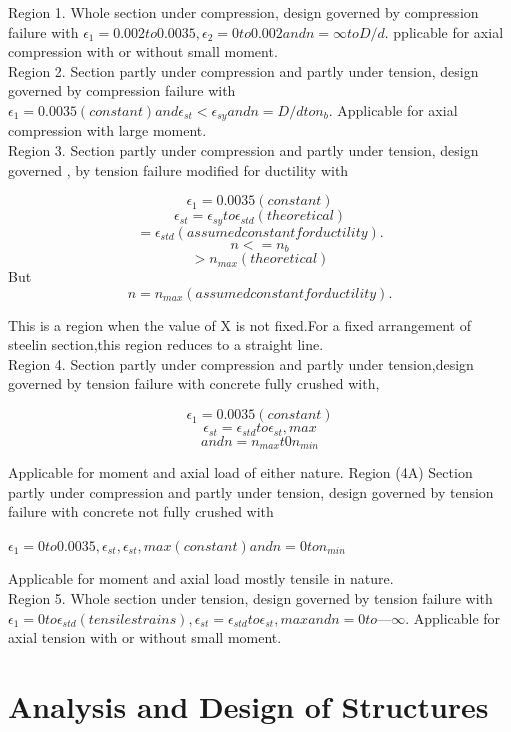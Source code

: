 Region 1. Whole section under compression, design governed by compression
failure with $\epsilon_1=0.002 to 0.0035, \epsilon_2=0 to 0.002 and n=\infty to D/d.$
pplicable for axial compression with or without small moment.\\

Region 2. Section partly under compression and partly under tension,
design governed by compression failure with
$\epsilon_1 = 0.0035 (constant) and \epsilon_{st} < \epsilon_{sy} and n = D/d to n_b.$
Applicable for axial compression with large moment.\\

Region 3. Section partly under compression and partly under tension,
design governed , by tension failure modiﬁed for ductility with

$$\epsilon_1 = 0.0035 (constant)$$
$$\epsilon_{st} =\epsilon_{sy} to \epsilon_{std} (theoretical)$$
$$=\epsilon_{std} (assumed constant for ductility).$$
$$n<= n_b$$
$$>n_{max} (theoretical)$$
But $$n=n_{max} (assumed constant for ductility).$$

This is a region when the value of X is not ﬁxed.For a ﬁxed arrangement
of steelin section,this region reduces to a straight line. \\

Region 4. Section partly under compression and partly under tension,design
governed by tension failure with concrete fully crushed with,

$$\epsilon_1 = 0.0035 (constant)$$
$$\epsilon_{st} = \epsilon_{std} to \epsilon_{st}, max$$
$$and n = n_{max} t0 n_{min}$$

Applicable for moment and axial load of either nature.
Region (4A) Section partly under compression and partly under tension,
design governed by tension failure with concrete not fully crushed with

$\epsilon_1 = 0 to0.0035, \epsilon_{st},\epsilon_{st},max(constant) and n = 0 to n_{min}$

Applicable for moment and axial load mostly tensile in nature.\\
Region 5. Whole section under tension, design governed by tension failure with 
$\epsilon_1 = 0 to \epsilon_{std} (tensile strains), \epsilon_{st}=\epsilon_{std}to \epsilon_{st}, max and n = 0 to — \infty.$
Applicable for axial tension with or without small moment.

\section{Analysis and Design of Structures}

